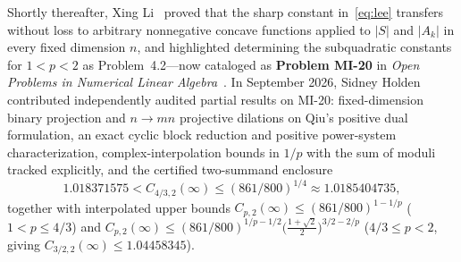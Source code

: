 \documentclass[10pt,letterpaper]{article}
\begin{document}
Shortly thereafter, Xing Li~\cite{Li2026} proved that the sharp constant in~\eqref{eq:lee} transfers without loss to arbitrary nonnegative concave functions applied to $|S|$ and $|A_k|$ in every fixed dimension $n$, and highlighted determining the subquadratic constants for $1 < p < 2$ as Problem~4.2—now cataloged as \textbf{Problem MI-20} in \emph{Open Problems in Numerical Linear Algebra}~\cite{OpenProblemsNLA}. In September 2026, Sidney Holden~\cite{Holden2026a,Holden2026b} contributed independently audited partial results on MI-20: fixed-dimension binary projection and $n \to mn$ projective dilations on Qiu's positive dual formulation, an exact cyclic block reduction and positive power-system characterization, complex-interpolation bounds in $1/p$ with the sum of moduli tracked explicitly, and the certified two-summand enclosure
\[
  1.018371575 < C_{4/3,2}(\infty) \le (861/800)^{1/4} \approx 1.0185404735,
\]
together with interpolated upper bounds $C_{p,2}(\infty) \le (861/800)^{1-1/p}$ ($1 < p \le 4/3$) and $C_{p,2}(\infty) \le (861/800)^{1/p-1/2}\bigl(\frac{1+\sqrt{2}}{2}\bigr)^{3/2-2/p}$ ($4/3 \le p < 2$, giving $C_{3/2,2}(\infty) \le 1.04458345$).
\end{document}
